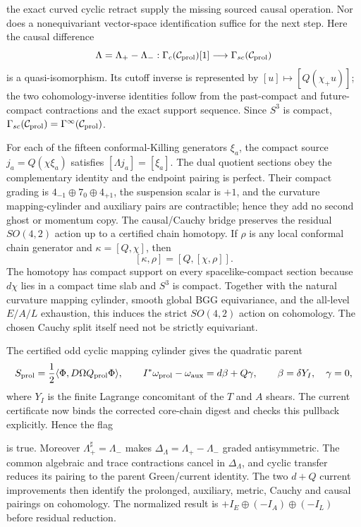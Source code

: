 \documentclass[11pt]{article}
\theoremstyle{definition}
\theoremstyle{remark}
\begin{document}
the exact curved cyclic retract supply the missing sourced causal operation.
Nor does a nonequivariant vector-space identification suffice for the next
step.  Here the causal difference
\begin{equation}\label{eq:causal-quasi-map}
 \Lambda=\Lambda_+-\Lambda_-:
 \Gamma_c(\mathcal C_{\rm prol})[1]
 \longrightarrow\Gamma_{sc}(\mathcal C_{\rm prol})
\end{equation}
is a quasi-isomorphism.  Its cutoff inverse is represented by
$[u]\mapsto[Q(\chi_+u)]$; the two cohomology-inverse identities follow from
the past-compact and future-compact contractions and the exact support
sequence.  Since $S^3$ is compact,
$\Gamma_{sc}(\mathcal C_{\rm prol})=\Gamma^\infty(\mathcal C_{\rm prol})$.

For each of the fifteen conformal-Killing generators $\xi_a$, the compact
source $j_a=Q(\chi\xi_a)$ satisfies
$[\Lambda j_a]=[\xi_a]$.  The dual quotient sections obey the complementary
identity and the endpoint pairing is perfect.  Their compact grading is
$4_{-1}\oplus7_0\oplus4_{+1}$, the suspension scalar is $+1$, and the
curvature mapping-cylinder and auxiliary pairs are contractible; hence they
add no second ghost or momentum copy.  The causal/Cauchy bridge preserves the
residual $SO(4,2)$ action up to a certified chain homotopy.  If $\rho$ is any
local conformal chain generator and $\kappa=[Q,\chi]$, then
\begin{equation}\label{eq:causal-cutoff-equivariance}
 [\kappa,\rho]=[Q,[\chi,\rho]].
\end{equation}
The homotopy has compact support on every spacelike-compact section because
$d\chi$ lies in a compact time slab and $S^3$ is compact.  Together with the
natural curvature mapping cylinder, smooth global BGG equivariance, and the
all-level $E/A/L$ exhaustion, this induces the strict $SO(4,2)$ action on
cohomology.  The chosen Cauchy split itself need not be strictly equivariant.

The certified odd cyclic mapping cylinder gives the
quadratic parent
\begin{equation}
 S_{\rm prol}=\frac12\langle\Phi,D\Omega Q_{\rm prol}\Phi\rangle,
 \qquad I^*\omega_{\rm prol}-\omega_{\rm aux}=d\beta+Q\gamma,
 \qquad \beta=\delta Y_I,\quad\gamma=0,
\end{equation}
where $Y_I$ is the finite Lagrange concomitant of the $T$ and $A$ shears.
The current certificate now binds the corrected core-chain digest and checks
this pullback explicitly.  Hence the flag
\begin{center}\small
{}
\end{center}
is true.  Moreover
$\Lambda_+^\sharp=\Lambda_-$ makes
$\Delta_\Lambda=\Lambda_+-\Lambda_-$ graded antisymmetric.  The common
algebraic and trace contractions cancel in $\Delta_\Lambda$, and cyclic
transfer reduces its pairing to the parent Green/current identity.  The two
$d+Q$ current improvements then identify the prolonged, auxiliary, metric,
Cauchy and causal pairings on cohomology.  The normalized result is
$+I_E\oplus(-I_A)\oplus(-I_L)$ before residual reduction.
\end{document}
